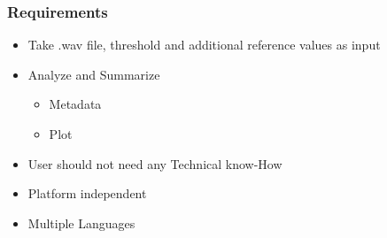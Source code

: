 \begin{frame}
    \frametitle{Requirements}
    \begin{itemize}[<+->]
        \large
        \item Take .wav file, threshold and additional reference values as input
        \item Analyze and Summarize 
        \begin{itemize}
            \large
            \item Metadata
            \item Plot
        \end{itemize}
        \item User should not need any Technical know-How
        \item Platform independent
        \item Multiple Languages
    \end{itemize}
\end{frame}
